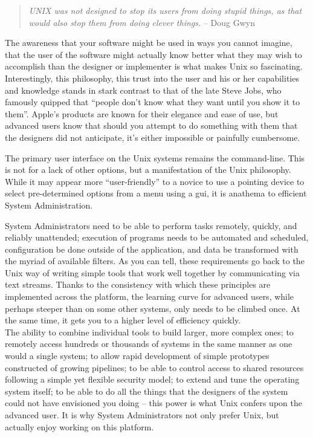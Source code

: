 \begin{quote}
{\em \textsc{UNIX} was not designed to
stop its users from doing stupid things, as that would
also stop them from doing clever things.} -- Doug
Gwyn
\end{quote}



The awareness that your software might be used in ways
you cannot imagine, that the user of the software
might actually know better what they may wish to
accomplish than the designer or implementer is what
makes Unix so fascinating.  Interestingly, this
philosophy, this trust into the user and his or her
capabilities and knowledge stands in stark contrast
to that of the late Steve Jobs, who famously quipped that ``people don't know
what they want until you show it to
them''\cite{history:jobs}.  Apple's products are known
for their elegance and ease of use, but advanced users
know that should you attempt to do something with them
that the designers did not anticipate, it's either
impossible or painfully cumbersome.

The primary user interface on the Unix systems remains
the command-line.  This is not for a lack
of other options, but a manifestation of the Unix
philosophy.  While it may appear more
``user-friendly'' to a novice to use a pointing device
to select pre-determined options from a menu using a
\gls{gui}, it is anathema to efficient System
Administration.

System Administrators need to be able to perform tasks
remotely, quickly, and reliably unattended; execution
of programs needs to be automated and scheduled,
configuration be done outside of the application, and
data be transformed with the myriad of available
filters.  As you can tell, these requirements go back
to the Unix way of writing simple tools that work well
together by communicating via text streams.
Thanks to the consistency with which these principles
are implemented across the platform, the learning
curve for advanced users, while perhaps steeper than
on some other systems, only needs to be climbed
once.  At the same time, it gets you to a higher level
of efficiency quickly.  \\

The ability to combine individual tools to build
larger, more complex ones; to remotely access hundreds
or thousands of systems in the same manner as one
would a single system; to allow rapid development of
simple prototypes constructed of growing pipelines; to
be able to control access to shared resources
following a simple yet flexible security model; to
extend and tune the operating system itself; to be
able to do all the things that the designers of the
system could not have envisioned you doing -- this
power is what Unix confers upon the advanced user.  It
is why System Administrators not only prefer Unix, but
actually enjoy working on this platform.

